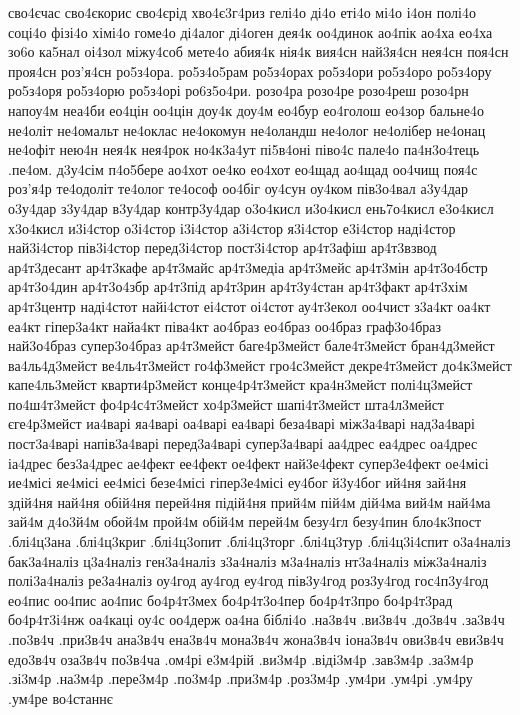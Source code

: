 {сво4єчас
сво4єкорис
сво4єрід
хво4є3г4риз
гелі4о
ді4о
еті4о
мі4о
і4он
полі4о
соці4о
фізі4о
хімі4о
гоме4о
ді4алог
ді4оген
дея4к
оо4динок
ао4пік
ао4ха
ео4ха
зо6о
ка5нал
оі4зол
міжу4соб
мете4о
абия4к
нія4к
вия4сн
най3я4сн
нея4сн
поя4сн
проя4сн
роз'я4сн
ро5з4ора.
ро5з4о5рам
ро5з4орах
ро5з4ори
ро5з4оро
ро5з4ору
ро5з4оря
ро5з4орю
ро5з4орі
ро6з5о4ри.
розо4ра
розо4ре
розо4реш
розо4рн
напоу4м
неа4би
ео4цін
оо4цін
доу4к
доу4м
ео4бур
ео4голош
ео4зор
бальне4о
не4оліт
не4омальт
не4оклас
не4окомун
не4оландш
не4олог
не4олібер
не4онац
не4офіт
нею4н
нея4к
нея4рок
но4к3а4ут
пі5в4оні
піво4с
пале4о
па4н3о4тець
.пе4ом.
д3у4сім
п4о5бере
ао4хот
ое4ко
ео4хот
ео4щад
ао4щад
оо4чищ
поя4с
роз'я4р
те4одоліт
те4олог
те4ософ
оо4біг
оу4сун
оу4ком
пів3о4вал
а3у4дар
о3у4дар
з3у4дар
в3у4дар
контр3у4дар
о3о4кисл
и3о4кисл
ень7о4кисл
е3о4кисл
х3о4кисл
и3і4стор
о3і4стор
і3і4стор
а3і4стор
я3і4стор
е3і4стор
наді4стор
най3і4стор
пів3і4стор
перед3і4стор
пост3і4стор
ар4т3афіш
ар4т3взвод
ар4т3десант
ар4т3кафе
ар4т3майс
ар4т3медіа
ар4т3мейс
ар4т3мін
ар4т3о4бстр
ар4т3о4дин
ар4т3о4збр
ар4т3під
ар4т3рин
ар4т3у4стан
ар4т3факт
ар4т3хім
ар4т3центр
наді4стот
найі4стот
еі4стот
оі4стот
ау4т3екол
оо4чист
з3а4кт
оа4кт
еа4кт
гіпер3а4кт
найа4кт
піва4кт
ао4браз
ео4браз
оо4браз
граф3о4браз
най3о4браз
супер3о4браз
ар4т3мейст
баге4р3мейст
бале4т3мейст
бран4д3мейст
ва4ль4д3мейст
ве4ль4т3мейст
го4ф3мейст
гро4с3мейст
декре4т3мейст
до4к3мейст
капе4ль3мейст
кварти4р3мейст
конце4р4т3мейст
кра4н3мейст
полі4ц3мейст
по4ш4т3мейст
фо4р4с4т3мейст
хо4р3мейст
шапі4т3мейст
шта4л3мейст
єге4р3мейст
иа4варі
яа4варі
оа4варі
еа4варі
беза4варі
між3а4варі
над3а4варі
пост3а4варі
напів3а4варі
перед3а4варі
супер3а4варі
аа4дрес
еа4дрес
оа4дрес
іа4дрес
без3а4дрес
ае4фект
ее4фект
ое4фект
най3е4фект
супер3е4фект
ое4місі
ие4місі
яе4місі
ее4місі
безе4місі
гіпер3е4місі
еу4бог
й3у4бог
ий4ня
зай4ня
здій4ня
най4ня
обій4ня
перей4ня
підій4ня
прий4м
пій4м
дій4ма
вий4м
най4ма
зай4м
д4о3й4м
обой4м
прой4м
обій4м
перей4м
безу4гл
безу4пин
бло4к3пост
.блі4ц3ана
.блі4ц3криг
.блі4ц3опит
.блі4ц3торг
.блі4ц3тур
.блі4ц3і4спит
о3а4наліз
бак3а4наліз
ц3а4наліз
ген3а4наліз
з3а4наліз
м3а4наліз
нт3а4наліз
між3а4наліз
полі3а4наліз
ре3а4наліз
оу4год
ау4год
еу4год
пів3у4год
роз3у4год
гос4п3у4год
ео4пис
оо4пис
ао4пис
бо4р4т3мех
бо4р4т3о4пер
бо4р4т3про
бо4р4т3рад
бо4р4т3і4нж
оа4каці
оу4с
оо4держ
оа4на
біблі4о
.на3в4ч
.ви3в4ч
.до3в4ч
.за3в4ч
.по3в4ч
.при3в4ч
ана3в4ч
ена3в4ч
мона3в4ч
жона3в4ч
іона3в4ч
ови3в4ч
еви3в4ч
едо3в4ч
оза3в4ч
по3в4ча
.ом4рі
е3м4рій
.ви3м4р
.віді3м4р
.зав3м4р
.за3м4р
.зі3м4р
.на3м4р
.пере3м4р
.по3м4р
.при3м4р
.роз3м4р
.ум4ри
.ум4рі
.ум4ру
.ум4ре
во4станнє
}
